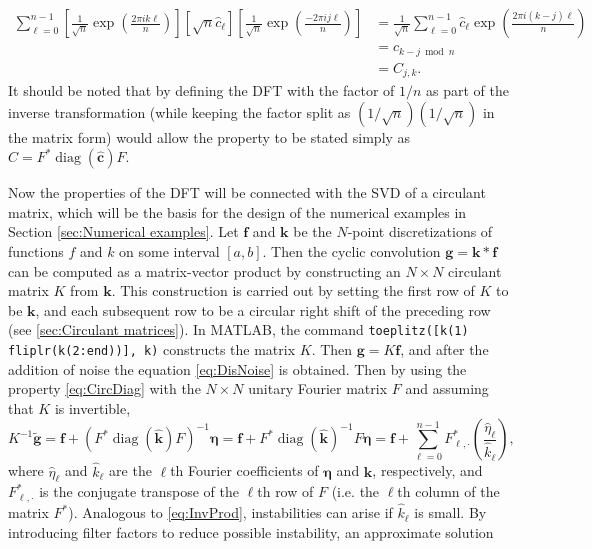 \documentclass[12pt]{article}
\newcommand{\gVec}{\mathbf{g}}	%
\newcommand{\gnoiseVec}{\widetilde{\mathbf{g}}}	%
\newcommand{\kVec}{\mathbf{k}}	%
\newcommand{\kMat}{K}	%
\newcommand{\fVec}{\mathbf{f}}	%
\newcommand{\ctrans}{*}	%
\DeclareMathOperator{\diag}{diag}	%
\newcommand{\noise}{\eta}	%
\newcommand{\noiseVec}{\bm{\noise}}	%
\begin{document}
\begin{align*}
\sum_{\ell=0}^{n-1} \left[\frac{1}{\sqrt{n}}  \exp\left(\frac{2\pi{i}k\ell}{n}\right)\right] \left[\sqrt{n}\widehat{c}_\ell\right] \left[\frac{1}{\sqrt{n}} \exp\left(\frac{-2\pi{i}j\ell}{n}\right)\right] &= \frac{1}{\sqrt{n}} \sum_{\ell=0}^{n-1} \widehat{c}_\ell \exp\left(\frac{2\pi{i}(k-j)\ell}{n}\right) \\
&= c_{k-j \bmod n} \\
&= C_{j,k}.
\end{align*}
It should be noted that by defining the DFT with the factor of $1/n$ as part of the inverse transformation (while keeping the factor split as $(1/\sqrt{n})(1/\sqrt{n})$ in the matrix form) would allow the property to be stated simply as $C = F^\ctrans\diag(\widehat{\mathbf{c}})F$. \par 
Now the properties of the DFT will be connected with the SVD of a circulant matrix, which will be the basis for the design of the numerical examples in Section \ref{sec:Numerical examples}. Let $\fVec$ and $\kVec$ be the $N$-point discretizations of functions $f$ and $k$ on some interval $[a,b]$. Then the cyclic convolution $\gVec = \kVec * \fVec$ can be computed as a matrix-vector product by constructing an $N \times N$ circulant matrix $\kMat$ from $\kVec$. This construction is carried out by setting the first row of $\kMat$ to be $\kVec$, and each subsequent row to be a circular right shift of the preceding row (see \ref{sec:Circulant matrices}). In MATLAB, the command \texttt{toeplitz([k(1) fliplr(k(2:end))], k)} constructs the matrix $\kMat$. Then $\gVec = \kMat\fVec$, and after the addition of noise the equation \eqref{eq:DisNoise} is obtained. Then by using the property \eqref{eq:CircDiag} with the $N \times N$ unitary Fourier matrix $F$ and assuming that $\kMat$ is invertible, 
\begin{equation}
\kMat^{-1}\gnoiseVec = \fVec + (F^\ctrans\diag(\widehat{\kVec})F)^{-1}\noiseVec = \fVec + F^\ctrans\diag(\widehat{\kVec})^{-1}F\noiseVec = \fVec + \sum_{\ell = 0}^{n-1} F^\ctrans_{\ell,\cdot}\left(\frac{\widehat{\noise}_\ell}{\widehat{k}_\ell}\right),
\label{eq:InvProdDFT}
\end{equation}
where $\widehat{\noise}_\ell$ and $\widehat{k}_\ell$ are the $\ell$th Fourier coefficients of $\noiseVec$ and $\kVec$, respectively, and $F^\ctrans_{\ell,\cdot}$ is the conjugate transpose of the $\ell$th row of $F$ (i.e. the $\ell$th column of the matrix $F^\ctrans$). Analogous to \eqref{eq:InvProd}, instabilities can arise if $\widehat{k}_\ell$ is small. By introducing filter factors to reduce possible instability, an approximate solution
\end{document}
